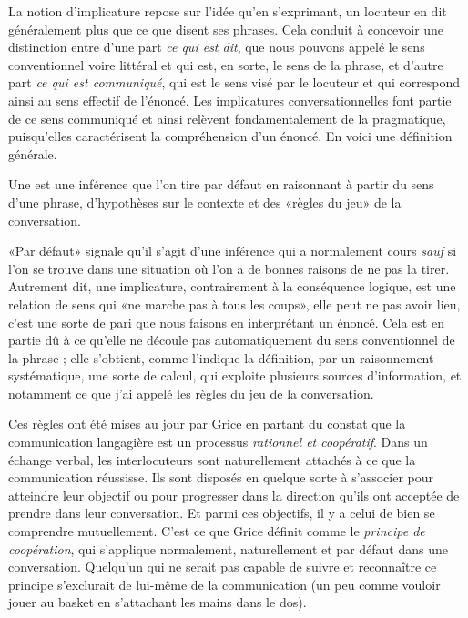 \begin{refsegment}
\largerpage
La notion d'implicature repose sur l'idée qu'en s'exprimant, un locuteur en dit  généralement plus que ce que  disent ses phrases.  
Cela conduit à concevoir une distinction entre d'une part \emph{ce qui est dit}, que nous pouvons appelé le sens conventionnel voire littéral %
et qui est, en sorte, le sens de la phrase, et d'autre part \emph{ce qui est communiqué}, qui est le sens visé par le locuteur et qui correspond ainsi au sens effectif de l'énoncé.  
Les implicatures conversationnelles font partie de ce sens communiqué et ainsi relèvent fondamentalement de la pragmatique, puisqu'elles caractérisent la compréhension d'un énoncé.
En voici une définition générale.



\begin{defi}\label{d:ic}
Une  est une inférence que l'on tire par défaut en raisonnant à partir du sens d'une phrase, d'hypothèses sur le contexte et des «règles du jeu» de la conversation.
\end{defi}


«Par défaut» signale qu'il s'agit d'une inférence qui a normalement cours \emph{sauf} si l'on se trouve dans une situation où l'on a de bonnes raisons de ne pas la tirer.  Autrement dit, une implicature, contrairement à la conséquence logique, est une relation de sens qui «ne marche pas à tous les coups», elle peut ne pas avoir lieu, c'est une sorte de pari que nous faisons en interprétant un énoncé. 
Cela est en partie dû à ce qu'elle ne découle pas automatiquement du sens conventionnel de la phrase ; elle s'obtient, comme l'indique la définition, par un raisonnement systématique, une sorte de calcul, qui exploite plusieurs sources d'information, et notamment ce que j'ai appelé les règles du jeu de la conversation. 

Ces règles ont été mises au jour par Grice en partant du constat que la communication langagière est un processus \emph{rationnel et coopératif}.
Dans un échange verbal, les interlocuteurs sont naturellement attachés à ce que la communication réussisse.  Ils sont disposés en quelque sorte à s'associer pour atteindre leur objectif ou pour progresser dans la direction qu'ils ont acceptée de prendre dans leur conversation.  
Et parmi ces objectifs, il y a %
celui de bien se comprendre mutuellement. 
C'est ce que Grice définit comme le \emph{principe de coopération}, qui s'applique normalement, naturellement et par défaut dans une conversation.
Quelqu'un qui ne serait pas capable de suivre et reconnaître ce principe s'exclurait de lui-même de la communication (un peu comme vouloir jouer au basket en s'attachant les mains dans le dos).


\end{refsegment}
